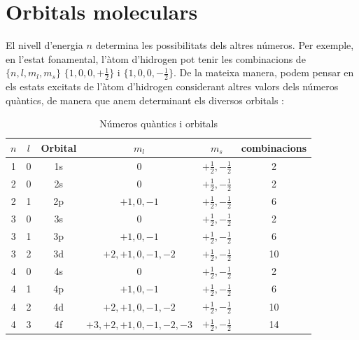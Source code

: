 \section{Orbitals moleculars}
El nivell d'energia $n$ determina les possibilitats dels altres números. Per exemple, en l'estat fonamental, l'àtom d'hidrogen pot tenir les combinacions de $\{n,l,m_l,m_s\}$ $\{1,0,0,+\frac{1}{2}\}$ i $\{1,0,0,-\frac{1}{2}\}$. De la mateixa manera, podem pensar en els estats excitats de l'àtom d'hidrogen considerant altres valors dels números quàntics, de manera que anem determinant els diversos orbitals :
\begin{table}[h!]
  \begin{center}
    \caption{Números quàntics i orbitals \cite{mahan_quimico_1977}}
    \label{tab:quant}
    \begin{tabular}{cccccc}
      \hline
      $n$ & $l$ & Orbital & $m_l$ & $m_s$ & combinacions\\
      \hline
      1 & 0 & 1s & 0 & $+\frac{1}{2},-\frac{1}{2}$ & 2 \\
      2 & 0 & 2s & 0 & $+\frac{1}{2},-\frac{1}{2}$ & 2 \\
      2 & 1 & 2p & $+1,0,-1$ & $+\frac{1}{2},-\frac{1}{2}$ & 6 \\
      3 & 0 & 3s & 0 & $+\frac{1}{2},-\frac{1}{2}$ & 2 \\
      3 & 1 & 3p & $+1,0,-1$ & $+\frac{1}{2},-\frac{1}{2}$ & 6 \\
      3 & 2 & 3d & $+2,+1,0,-1,-2$ & $+\frac{1}{2},-\frac{1}{2}$ & 10 \\
      4 & 0 & 4s & 0 & $+\frac{1}{2},-\frac{1}{2}$ & 2 \\
      4 & 1 & 4p & $+1,0,-1$ & $+\frac{1}{2},-\frac{1}{2}$ & 6 \\
      4 & 2 & 4d & $+2,+1,0,-1,-2$ & $+\frac{1}{2},-\frac{1}{2}$ & 10 \\
      4 & 3 & 4f & $+3,+2,+1,0,-1,-2,-3$ & $+\frac{1}{2},-\frac{1}{2}$ & 14 \\
      \hline
    \end{tabular}
  \end{center}
\end{table}

